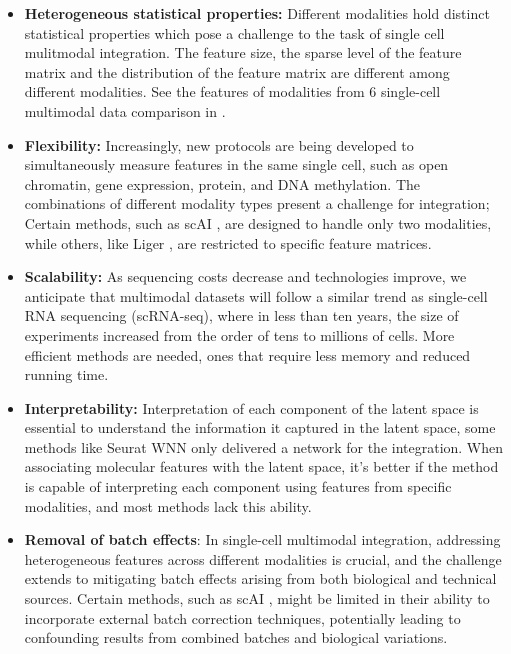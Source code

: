 \begin{itemize}
	\item \textbf{Heterogeneous statistical properties:}
	 Different modalities hold distinct statistical properties which pose a challenge to the task of single cell mulitmodal integration. The feature size, the sparse level of the feature matrix and the distribution of the feature matrix are different among different modalities. See the features of modalities from 6 single-cell multimodal data comparison in .

	\item \textbf{Flexibility:}
	Increasingly, new protocols are being developed to simultaneously measure features in the same single cell, such as open chromatin, gene expression, protein, and DNA methylation. The combinations of different modality types present a challenge for integration; Certain methods, such as scAI \cite{jin2020scai}, are designed to handle only two modalities, while others, like Liger \citep{kriebel2022uinmf}, are restricted to specific feature matrices.

	\item \textbf{Scalability:} 
	As sequencing costs decrease and technologies improve, we anticipate that multimodal datasets will follow a similar trend as single-cell RNA sequencing (scRNA-seq), where in less than ten years, the size of experiments increased from the order of tens to millions of cells\citep{svensson2018exponential}. More efficient methods are needed, ones that require less memory and reduced running time.

	\item \textbf{Interpretability:}
	Interpretation of each component of the latent space is essential to understand the information it captured in the latent space, some methods like Seurat WNN \citep{hao2021seurat4} only delivered a network for the integration. When associating molecular features with the latent space, it's better if the method is capable of interpreting each component using features from specific modalities, and most methods lack this ability.

	\item \textbf{Removal of batch effects}: 
	In single-cell multimodal integration, addressing heterogeneous features across different modalities is crucial, and the challenge extends to mitigating batch effects arising from both biological and technical sources. Certain methods, such as scAI \citep{jin2020scai}, might be limited in their ability to incorporate external batch correction techniques, potentially leading to confounding results from combined batches and biological variations.


\end{itemize}
